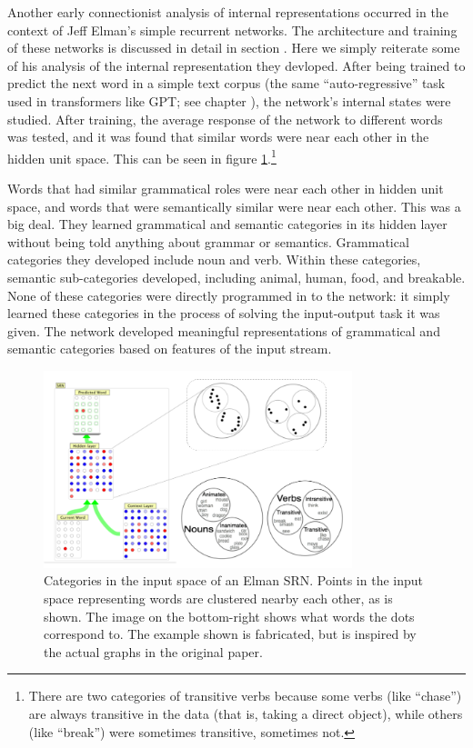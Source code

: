 Another early connectionist analysis of internal representations occurred in the context of Jeff Elman's simple recurrent networks. The architecture and training of these networks is discussed in detail in section . Here we simply reiterate some of his analysis of the internal representation they devloped. After being trained to predict the next word in a simple text corpus (the same ``auto-regressive'' task used in transformers like GPT; see chapter ), the network's internal states were studied. After training, the average response of the network to different words was tested, and it was found that similar words were near each other in the hidden unit space. This can be seen in figure \ref{elman_srn_categories}.\footnote{There are two categories of transitive verbs because some verbs (like ``chase'') are always transitive in the data (that is, taking a direct object), while others (like ``break'') were sometimes transitive, sometimes not.}

Words that had similar grammatical roles were near each other in hidden unit space, and words that were semantically similar were near each other. This was a big deal. They learned grammatical and semantic categories in its hidden layer without being told anything about grammar or semantics. Grammatical categories they developed include noun and verb. Within these categories, semantic sub-categories developed, including animal, human, food, and breakable. None of these categories were directly programmed in to the network: it simply learned these categories in the process of solving the input-output task it was given. The network developed meaningful representations of grammatical and semantic categories based on features of the input stream.

\begin{figure}[h]
\centering
\includegraphics[width=0.8\textwidth]{images/elmanCategoriesSpace.png}
\caption[Jeff Yoshimi.]{Categories in the input space of an Elman SRN. Points in the input space representing words are clustered nearby each other, as is shown. The image on the bottom-right shows what words the dots correspond to. The example shown is fabricated, but is inspired by the actual graphs in the original paper.}
\label{elman_srn_categories}
\end{figure}

